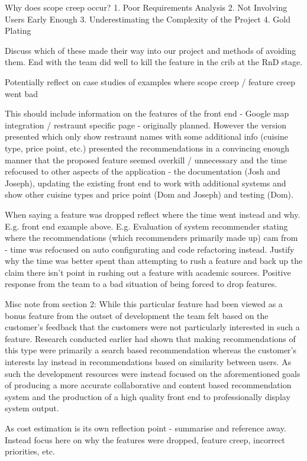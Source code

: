 \documentclass{l3proj}
\begin{document}
Why does scope creep occur?
1. Poor Requirements Analysis
2. Not Involving Users Early Enough
3. Underestimating the Complexity of the Project
4. Gold Plating

Discuss which of these made their way into our project and methods of avoiding them. End with the team did well to kill the feature in the crib at the RnD stage.

Potentially reflect on case studies of examples where scope creep / feature creep went bad

This should include information on the features of the front end - Google map integration / restraunt specific page - originally planned. However the version presented which only show restraunt names with some additional info (cuisine type, price point, etc.) presented the recommendations in a convincing enough manner that the proposed feature seemed overkill / unnecessary and the time refocused to other aspects of the application - the documentation (Josh and Joseph), updating the existing front end to work with additional systems and show other cuisine types and price point (Dom and Joseph) and testing (Dom).

When saying a feature was dropped reflect where the time went instead and why. E.g. front end example above. E.g. Evaluation of system recommender stating where the recommendations (which recommenders primarily made up) cam from - time was refocused on auto configurating and code refactoring instead. Justify why the time was better spent than attempting to rush a feature and back up the claim there isn't point in rushing out a feature with academic sources. Positive response from the team to a bad situation of being forced to drop features.    

Misc note from section 2:
While this particular feature had been viewed as a bonus feature from the outset of development the team felt based on the customer’s feedback that the customers were not particularly interested in such a feature. Research conducted earlier had shown that making recommendations of this type were primarily a search based recommendation whereas the customer’s interests lay instead in recommendations based on similarity between users. As such the development resources were instead focused on the aforementioned goals of producing a more accurate collaborative and content based recommendation system and the production of a high quality front end to professionally display system output. 

As cost estimation is its own reflection point - summarise and reference away. Instead focus here on why the features were dropped, feature creep, incorrect priorities, etc.
\end{document}
